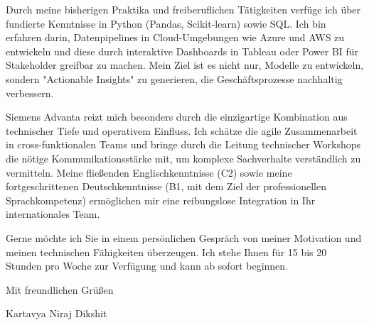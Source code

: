\documentclass[10pt, a4paper]{article}
\begin{document}
Durch meine bisherigen Praktika und freiberuflichen Tätigkeiten verfüge ich über fundierte Kenntnisse in Python (Pandas, Scikit-learn) sowie SQL. Ich bin erfahren darin, Datenpipelines in Cloud-Umgebungen wie Azure und AWS zu entwickeln und diese durch interaktive Dashboards in Tableau oder Power BI für Stakeholder greifbar zu machen. Mein Ziel ist es nicht nur, Modelle zu entwickeln, sondern "Actionable Insights" zu generieren, die Geschäftsprozesse nachhaltig verbessern.

Siemens Advanta reizt mich besonders durch die einzigartige Kombination aus technischer Tiefe und operativem Einfluss. Ich schätze die agile Zusammenarbeit in cross-funktionalen Teams und bringe durch die Leitung technischer Workshops die nötige Kommunikationsstärke mit, um komplexe Sachverhalte verständlich zu vermitteln. Meine fließenden Englischkenntnisse (C2) sowie meine fortgeschrittenen Deutschkenntnisse (B1, mit dem Ziel der professionellen Sprachkompetenz) ermöglichen mir eine reibungslose Integration in Ihr internationales Team.

Gerne möchte ich Sie in einem persönlichen Gespräch von meiner Motivation und meinen technischen Fähigkeiten überzeugen. Ich stehe Ihnen für 15 bis 20 Stunden pro Woche zur Verfügung und kann ab sofort beginnen.

Mit freundlichen Grüßen

\vspace{20pt}
Kartavya Niraj Dikshit
\end{document}
